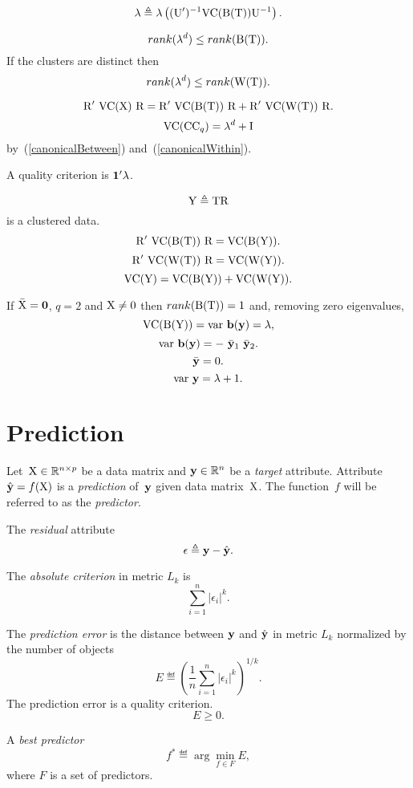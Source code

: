 \documentclass[10pt,a4paper]{article}
\theoremstyle{plain} \newtheorem{Lem}{Lemma}
\begin{document}
$$ \mathbf \lambda \triangleq \mathbf \lambda \left((\mathrm U')^{-1} \mathrm {VC}(\mathrm B(\mathrm T)) \mathrm U^{-1} \right). $$

$$ rank (\mathbf \lambda^d) \le rank(\mathrm B(\mathrm T)). $$
If the clusters are distinct then
$$ rank (\mathbf \lambda^d) \le rank(\mathrm W(\mathrm T)). $$

$$ \mathrm R' \ \mathrm {VC}(\mathrm X) \ \mathrm R = \mathrm R' \ \mathrm {VC}(\mathrm B(\mathrm T)) \ \mathrm R + \mathrm R' \ \mathrm {VC}(\mathrm W(\mathrm T)) \ \mathrm R. $$
$$ \mathrm {VC} (\mathrm {CC}_q) = \mathbf \lambda^d + \mathrm I $$
by~(\ref{canonicalBetween}) and~(\ref{canonicalWithin}).

A quality criterion is $\mathbf 1' \mathbf \lambda$.

\bigskip
$$ \mathrm Y \triangleq \mathrm T \mathrm R $$
is a clustered data.
$$ \mathrm R' \ \mathrm {VC}(\mathrm B(\mathrm T)) \ \mathrm R = \mathrm {VC}(\mathrm B(\mathrm Y)). $$
$$ \mathrm R' \ \mathrm {VC}(\mathrm W(\mathrm T)) \ \mathrm R = \mathrm {VC}(\mathrm W(\mathrm Y)). $$
$$ \mathrm {VC}(\mathrm Y) = \mathrm {VC}(\mathrm B(\mathrm Y)) + \mathrm {VC}(\mathrm W(\mathrm Y)). $$

\bigskip
If $\bar {\mathrm X} = \mathbf 0$, $q = 2$ and $\mathrm X \ne \mathrm 0$ 
then $rank (\mathrm B(\mathrm T)) = 1$
and, removing zero eigenvalues, 
$$\mathrm {VC}(\mathrm B(\mathrm Y)) = \mathrm {var} \  \mathbf b(\mathbf y) = \lambda, $$
$$ \mathrm {var} \  \mathbf b(\mathbf y) = - \ {\bar {\mathbf y}}_1 \ {\bar {\mathbf y}}_2. $$
$$ \bar {\mathbf y} = 0. $$
$$ \mathrm {var} \  \mathbf y = \lambda + 1. $$



\section{Prediction}
Let~$\mathrm X \in \mathbb R^{n \times p}$ be a data matrix and $\mathbf y \in \mathbb R^n$ be a {\em target} attribute.
Attribute~$\hat {\mathbf y}=f(\mathrm X)$ is a {\em prediction} of~$\mathbf y$ given data matrix~$\mathrm X$.
The function~$f$ will be referred to as the {\em predictor}.

The {\em residual} attribute
$$ \mathbf \epsilon \triangleq \mathbf y - \hat {\mathbf y}. $$

The {\em absolute criterion} in metric $L_k$ is
$$ \sum_{i=1}^n |\epsilon_i|^k. $$

The {\em prediction error} is the distance between $\mathbf y$ and $\hat {\mathbf y}$ in metric $L_k$ normalized by the number of objects
$$ E \eqdef \left(\frac 1 n \sum_{i=1}^n |\epsilon_i|^k \right)^{1/k}. $$
The prediction error is a quality criterion.
$$ E \ge 0. $$

A {\em best predictor}
\begin{equation} \label{bestPredictor}
f^* \eqdef \arg \min_{f \in F} E, 
\end{equation}
where $F$ is a set of predictors.
\end{document}
